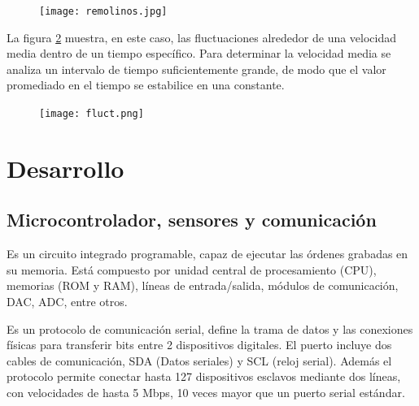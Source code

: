 \begin{figure}[h!]
	\centering
	\texttt{[image: remolinos.jpg]}
	\label{fig:remolinos}
\end{figure}


La figura \ref{fig:fluct} muestra, en este caso, las fluctuaciones alrededor de una velocidad media dentro de un tiempo específico. 
Para determinar la velocidad media se analiza un intervalo de tiempo suficientemente grande, de modo que el valor promediado en el tiempo se estabilice en una constante.

\begin{figure}[h!]
	\centering
	\texttt{[image: fluct.png]}
	\label{fig:fluct}
\end{figure}


\newpage
\section{Desarrollo}  \label{sec:desarr}

\subsection{Microcontrolador, sensores y comunicación}
\label{sec:ads1115}

\begin{tcolorbox}[colback=blue!5!white,colframe=blue!75!black,title=Microcontrolador] Es un circuito integrado programable, capaz de ejecutar las órdenes grabadas en su memoria. Está compuesto por unidad central de procesamiento (CPU), memorias (ROM y RAM), líneas de entrada/salida, módulos de comunicación, DAC, ADC, entre otros.
\end{tcolorbox}

\begin{tcolorbox}[colback=blue!5!white,colframe=blue!75!black,title=I$^2$C]
	Es un protocolo de comunicación serial, define la trama de datos y las conexiones físicas para transferir bits entre 2 dispositivos digitales. El puerto incluye dos cables de comunicación, SDA (Datos seriales) y SCL (reloj serial). Además el protocolo permite conectar hasta 127 dispositivos esclavos mediante dos líneas, con velocidades de hasta 5 Mbps, 10 veces mayor que un puerto serial estándar. \end{tcolorbox}



	

